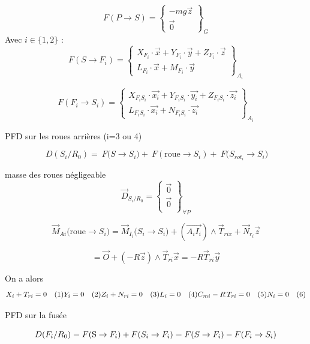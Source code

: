 \documentclass[a4paper,12pt]{report}  %
\begin{document}
$$
F(P \to S) = 
\begin{Bmatrix}
	-mg\vec{z} \\
	\vec0 
\end{Bmatrix}_{G}
$$
Avec $i \in \{1,2\}$ : 
$$
F(S \to F_i) = 
\begin{Bmatrix}
	X_{F_i} \cdot \vec{x} + Y_{F_i} \cdot \vec{y} + Z_{F_i} \cdot \vec{z} \\
	L_{F_i} \cdot \vec{x} + M_{F_i} \cdot \vec{y}
\end{Bmatrix}_{A_{i}}
$$

$$
F(F_i \to S_i) = 
\begin{Bmatrix}
	X_{F_i S_i} \cdot \vec{x_i} + Y_{F_i S_i} \cdot \vec{y_i} + Z_{F_i S_i} \cdot \vec{z_i} \\
	L_{F_i S_i} \cdot \vec{x_i} + N_{F_i S_i} \cdot \vec{z_i}
\end{Bmatrix}_{A_{i}}
$$



PFD sur les roues arrières (i=3 ou 4)

$$\ {D}({S_i/R_0}) = \ {F}({S \rightarrow S_i)} + \ {F}{(\text{roue} \rightarrow S_i)} + \ {F} ({S_{rot_i}\rightarrow S_i)}$$

masse des roues négligeable $$\vec{D}_{S_i/R_0} = \begin{Bmatrix}
	\vec{0} \\
	\vec{0}\\ \end{Bmatrix}_{\forall P}$$


$$
\vec{M}_{Ai}({\text{roue} \rightarrow S_i)} = \vec{M}_{I_i}({S_i \rightarrow S_i)} + \left( \overrightarrow{A_iI_i} \right) \wedge \vec{T}_{rix} + \vec{N}_{r_i} \vec{z}
$$

$$ = \vec{O} + ({-R}\vec{z})\wedge\vec{T}_{ri}\vec{x} = -R\vec{T}_{ri}\vec{y}
$$

On a alors
$$
	X_i + T_{ri} = 0 \quad (1) \\
	Y_i = 0 \quad (2) \\
	Z_i + N_{ri} = 0 \quad (3) \\
	L_i = 0 \quad  (4) \\
	C_{mi} - R\,T_{ri} = 0 \quad  (5) \\
	N_i = 0 \quad  (6)
$$


PFD sur la fusée

$$
	D(F_i/R_0) = {F}(\text{S}\rightarrow F_i) + {F}(S_i \rightarrow F_i) \\
	= {F}(S \rightarrow F_i) - {F}(F_i \rightarrow S_i) \\
$$
\end{document}
